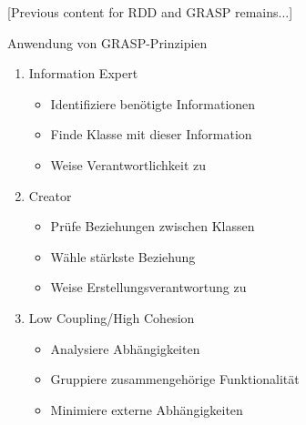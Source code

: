 [Previous content for RDD and GRASP remains...]

\begin{KR}{Anwendung von GRASP-Prinzipien}
\begin{enumerate}
    \item Information Expert
    \begin{itemize}
        \item Identifiziere benötigte Informationen
        \item Finde Klasse mit dieser Information
        \item Weise Verantwortlichkeit zu
    \end{itemize}
    
    \item Creator
    \begin{itemize}
        \item Prüfe Beziehungen zwischen Klassen
        \item Wähle stärkste Beziehung
        \item Weise Erstellungsverantwortung zu
    \end{itemize}
    
    \item Low Coupling/High Cohesion
    \begin{itemize}
        \item Analysiere Abhängigkeiten
        \item Gruppiere zusammengehörige Funktionalität
        \item Minimiere externe Abhängigkeiten
    \end{itemize}
\end{enumerate}
\end{KR}